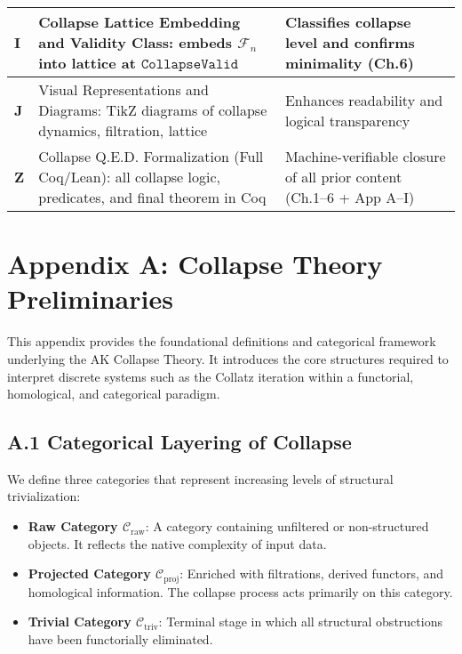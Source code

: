 \documentclass[11pt]{article}
\begin{document}
\begin{tabularx}{\textwidth}{|l|X|X|}
\hline
\textbf{I} & Collapse Lattice Embedding and Validity Class: embeds \( \mathcal{F}_n \) into lattice at \( \texttt{CollapseValid} \) & Classifies collapse level and confirms minimality (Ch.6) \\
\hline
\textbf{J} & Visual Representations and Diagrams: TikZ diagrams of collapse dynamics, filtration, lattice & Enhances readability and logical transparency \\
\hline
\textbf{Z} & Collapse Q.E.D. Formalization (Full Coq/Lean): all collapse logic, predicates, and final theorem in Coq & Machine-verifiable closure of all prior content (Ch.1–6 + App A–I) \\
\hline
\end{tabularx}



\appendix
\section*{Appendix A: Collapse Theory Preliminaries}

This appendix provides the foundational definitions and categorical framework underlying the AK Collapse Theory. It introduces the core structures required to interpret discrete systems such as the Collatz iteration within a functorial, homological, and categorical paradigm.

\subsection*{A.1 Categorical Layering of Collapse}

We define three categories that represent increasing levels of structural trivialization:

\begin{itemize}
  \item \textbf{Raw Category \( \mathcal{C}_{\mathrm{raw}} \)}:  
  A category containing unfiltered or non-structured objects. It reflects the native complexity of input data.

  \item \textbf{Projected Category \( \mathcal{C}_{\mathrm{proj}} \)}:  
  Enriched with filtrations, derived functors, and homological information. The collapse process acts primarily on this category.

  \item \textbf{Trivial Category \( \mathcal{C}_{\mathrm{triv}} \)}:  
  Terminal stage in which all structural obstructions have been functorially eliminated.
\end{itemize}
\end{document}
